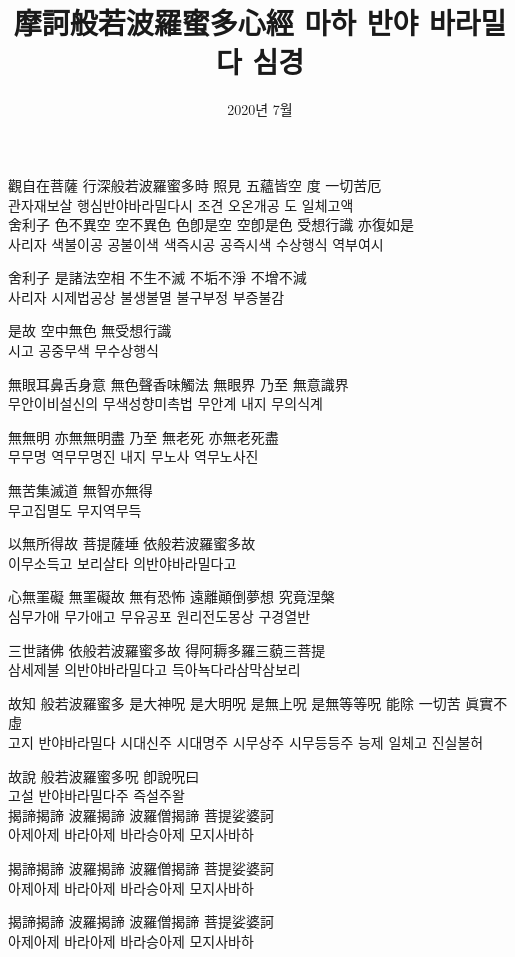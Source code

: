 \documentclass[17pt, a2paper ]{tikzposter}
\title{ 摩訶般若波羅蜜多心經  마하 반야 바라밀다 심경 }
\author{ 2020년 7월 }
\begin{document}
	\maketitle





			{
				\begin{LARGE}



觀自在菩薩 行深般若波羅蜜多時 照見 五蘊皆空 度 一切苦厄 \\
관자재보살 행심반야바라밀다시 조견 오온개공 도 일체고액 \\

舍利子 色不異空 空不異色 色卽是空 空卽是色 受想行識 亦復如是\\
사리자 색불이공 공불이색 색즉시공 공즉시색 수상행식 역부여시

舍利子 是諸法空相 不生不滅 不垢不淨 不增不減\\
사리자 시제법공상 불생불멸 불구부정 부증불감

是故 空中無色 無受想行識\\
시고 공중무색 무수상행식

無眼耳鼻舌身意 無色聲香味觸法 無眼界 乃至 無意識界\\
무안이비설신의 무색성향미촉법 무안계 내지 무의식계

無無明 亦無無明盡 乃至 無老死 亦無老死盡\\
무무명 역무무명진 내지 무노사 역무노사진

無苦集滅道 無智亦無得\\
무고집멸도 무지역무득

以無所得故 菩提薩埵 依般若波羅蜜多故\\
이무소득고 보리살타 의반야바라밀다고

心無罣礙 無罣礙故 無有恐怖 遠離顚倒夢想 究竟涅槃\\
심무가애 무가애고 무유공포 원리전도몽상 구경열반

三世諸佛 依般若波羅蜜多故 得阿耨多羅三藐三菩提\\
삼세제불 의반야바라밀다고 득아뇩다라삼막삼보리

故知 般若波羅蜜多 是大神呪 是大明呪 是無上呪 是無等等呪 能除 一切苦 眞實不虛\\
고지 반야바라밀다 시대신주 시대명주 시무상주 시무등등주 능제 일체고 진실불허

故說 般若波羅蜜多呪 卽說呪曰\\
고설 반야바라밀다주 즉설주왈 \\

揭諦揭諦 波羅揭諦 波羅僧揭諦 菩提娑婆訶\\
아제아제 바라아제 바라승아제 모지사바하

揭諦揭諦 波羅揭諦 波羅僧揭諦 菩提娑婆訶\\
아제아제 바라아제 바라승아제 모지사바하

揭諦揭諦 波羅揭諦 波羅僧揭諦 菩提娑婆訶\\
아제아제 바라아제 바라승아제 모지사바하

				\end{LARGE}
			}
\end{document}
